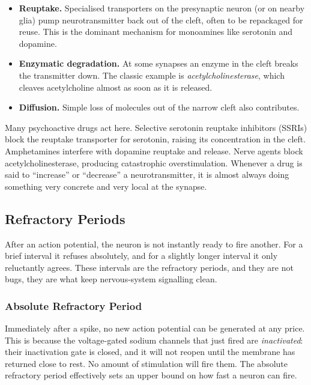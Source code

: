\documentclass[11pt]{article}
\begin{document}
\begin{itemize}
    \item \textbf{Reuptake.} Specialised transporters on the presynaptic neuron (or on nearby glia) pump neurotransmitter back out of the cleft, often to be repackaged for reuse. This is the dominant mechanism for monoamines like serotonin and dopamine.
    \item \textbf{Enzymatic degradation.} At some synapses an enzyme in the cleft breaks the transmitter down. The classic example is \textit{acetylcholinesterase}, which cleaves acetylcholine almost as soon as it is released.
    \item \textbf{Diffusion.} Simple loss of molecules out of the narrow cleft also contributes.
\end{itemize}

Many psychoactive drugs act here. Selective serotonin reuptake inhibitors (SSRIs) block the reuptake transporter for serotonin, raising its concentration in the cleft. Amphetamines interfere with dopamine reuptake and release. Nerve agents block acetylcholinesterase, producing catastrophic overstimulation. Whenever a drug is said to ``increase'' or ``decrease'' a neurotransmitter, it is almost always doing something very concrete and very local at the synapse.

\subsection{Refractory Periods}

After an action potential, the neuron is not instantly ready to fire another. For a brief interval it refuses absolutely, and for a slightly longer interval it only reluctantly agrees. These intervals are the refractory periods, and they are not bugs, they are what keep nervous-system signalling clean.

\subsubsection{Absolute Refractory Period}

Immediately after a spike, no new action potential can be generated at any price. This is because the voltage-gated sodium channels that just fired are \textit{inactivated}: their inactivation gate is closed, and it will not reopen until the membrane has returned close to rest. No amount of stimulation will fire them. The absolute refractory period effectively sets an upper bound on how fast a neuron can fire.
\end{document}
